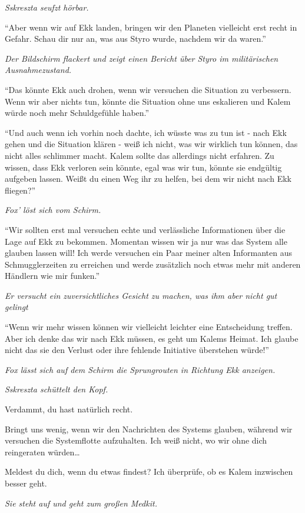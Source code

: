 \documentclass[11pt]{scrartcl}
\begin{document}
\emph{Sskreszta seufzt hörbar.}

``Aber wenn wir auf Ekk landen, bringen wir den Planeten vielleicht erst
recht in Gefahr. Schau dir nur an, was aus Styro wurde, nachdem wir da
waren.''

\emph{Der Bildschirm flackert und zeigt einen Bericht über Styro im
militärischen Ausnahmezustand.}

``Das könnte Ekk auch drohen, wenn wir versuchen die Situation zu
verbessern. Wenn wir aber nichts tun, könnte die Situation ohne uns
eskalieren und Kalem würde noch mehr Schuldgefühle haben.''

``Und auch wenn ich vorhin noch dachte, ich wüsste was zu tun ist - nach
Ekk gehen und die Situation klären - weiß ich nicht, was wir wirklich
tun können, das nicht alles schlimmer macht. Kalem sollte das allerdings
nicht erfahren. Zu wissen, dass Ekk verloren sein könnte, egal was wir
tun, könnte sie endgültig aufgeben lassen. Weißt du einen Weg ihr zu
helfen, bei dem wir nicht nach Ekk fliegen?''

\emph{Fox' löst sich vom Schirm.}

``Wir sollten erst mal versuchen echte und verlässliche Informationen
über die Lage auf Ekk zu bekommen. Momentan wissen wir ja nur was das
System alle glauben lassen will! Ich werde versuchen ein Paar meiner
alten Informanten aus Schmugglerzeiten zu erreichen und werde zusätzlich
noch etwas mehr mit anderen Händlern wie mir funken.''

\emph{Er versucht ein zuversichtliches Gesicht zu machen, was ihm aber
nicht gut gelingt}

``Wenn wir mehr wissen können wir vielleicht leichter eine Entscheidung
treffen. Aber ich denke das wir nach Ekk müssen, es geht um Kalems
Heimat. Ich glaube nicht das sie den Verlust oder ihre fehlende
Initiative überstehen würde!''

\emph{Fox lässt sich auf dem Schirm die Sprungrouten in Richtung Ekk
anzeigen.}

\emph{Sskreszta schüttelt den Kopf.}

Verdammt, du hast natürlich recht.

Bringt uns wenig, wenn wir den Nachrichten des Systems glauben, während
wir versuchen die Systemflotte aufzuhalten. Ich weiß nicht, wo wir ohne
dich reingeraten würden\ldots{}

Meldest du dich, wenn du etwas findest? Ich überprüfe, ob es Kalem
inzwischen besser geht.

\emph{Sie steht auf und geht zum großen Medkit.}
\end{document}
